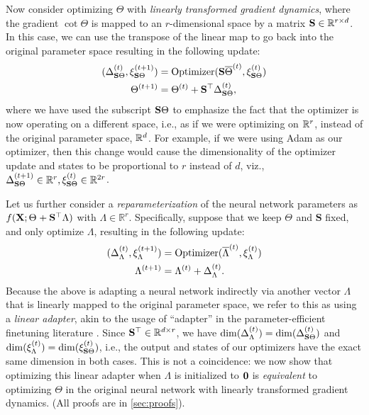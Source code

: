 \setlength{\abovedisplayskip}{4pt}
\setlength{\belowdisplayskip}{4pt}
Now consider optimizing $\Theta$ with \emph{linearly transformed gradient dynamics}, where the gradient $\cot \Theta$ is mapped to an $r$-dimensional space by a matrix ${\mathbf{S}} \in \mathbb{R}^{r \times d}$. 
In this case, we can use the transpose of the linear map to go back into the original parameter space resulting in the following update:
\begin{align*}
   (\Delta_{{\mathbf{S}}\Theta}^{(t)}, \xi_{{\mathbf{S}}\Theta}^{(t+1)}) &= \operatorname{Optimizer}({\mathbf{S}}\overline{\Theta}^{(t)}, \xi_{{\mathbf{S}}\Theta}^{(t)}) \\
    \Theta^{(t+1)} &= \Theta^{(t)} + {\mathbf{S}}^{\top}\Delta_{{\mathbf{S}}\Theta}^{(t)},
\end{align*}
where we have used the subscript ${\mathbf{S}}\Theta$ to emphasize the fact that the optimizer is now operating on a different space, i.e., as if we were optimizing on $\mathbb{R}^r$, instead of the original parameter space, $\mathbb{R}^d$.
For example, if we were using Adam as our optimizer, then this change would cause the dimensionality of the optimizer update and states to be proportional to $r$ instead of $d$, viz., $\Delta_{{\mathbf{S}}\Theta}^{(t + 1)} \in \mathbb{R}^{r}, \xi_{{\mathbf{S}}\Theta}^{(t)} \in \mathbb{R}^{2r}$.

Let us further consider a \emph{reparameterization} of the neural network parameters as  $f({\mathbf{X}}; \Theta^{} + {\mathbf{S}}^\top \Lambda)$ with $\Lambda \in \mathbb{R}^{r}$. Specifically, suppose that we keep $\Theta^{}$ and $\mathbf{S}$ fixed, and only optimize $\Lambda$, resulting in the following update:
\begin{subequations}
\label{eq:reparameterized-optim-definition}
\begin{align}
   (\Delta_{\Lambda}^{(t)}, \xi_{\Lambda}^{(t+1)}) &= \operatorname{Optimizer}( \overline{\Lambda}^{(t)}, \xi_{\Lambda}^{(t)}) \\
    \Lambda^{(t+1)} &= \Lambda^{(t)} + \Delta_{\Lambda}^{(t)}.
\end{align}
\end{subequations}
Because the above is adapting a neural network  indirectly via another vector $\Lambda$ that is linearly mapped to the original parameter space, we refer to this as using a \emph{linear adapter}, akin to the usage of ``adapter'' in the parameter-efficient finetuning literature \citep{houlsby2019parameter,lora}.
Since ${\mathbf{S}}^\top \in \mathbb{R}^{d \times r}$,  we have $\dim(\Delta_{\Lambda}^{(t)}) = \dim(\Delta_{{\mathbf{S}}\Theta}^{(t)})$ and $\dim(\xi_{\Lambda}^{(t)}) = \dim(\xi_{{\mathbf{S}} \Theta}^{(t)})$, i.e., 
the output and states of our optimizers have the exact same dimension in both cases.
This is not a coincidence: we now show that optimizing this linear adapter when $\Lambda$ is initialized to ${\mathbf{0}}$  is 
\emph{equivalent} to optimizing $\Theta$ in the original neural network with linearly transformed gradient dynamics. (All proofs are in \cref{sec:proofs}).
\setlength{\abovedisplayskip}{\baselineskip}
\setlength{\belowdisplayskip}{\baselineskip}


